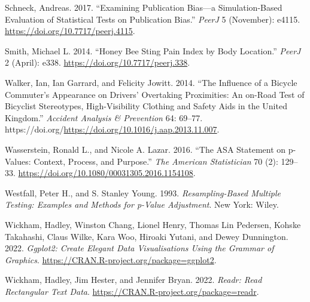 \documentclass[
]{book}
\newlength{\cslhangindent}
\newlength{\cslentryspacingunit} %
\newenvironment{CSLReferences}[2] %
 {%
  \setlength{\parindent}{0pt}
  \ifodd #1
  \let\oldpar\par
  \def\par{\hangindent=\cslhangindent\oldpar}
  \fi
  \setlength{\parskip}{#2\cslentryspacingunit}
 }%
 {}
\begin{document}
\begin{CSLReferences}{1}{0}
\leavevmode{}%
Schneck, Andreas. 2017. {``Examining Publication Bias---a Simulation-Based Evaluation of Statistical Tests on Publication Bias.''} \emph{PeerJ} 5 (November): e4115. \url{https://doi.org/10.7717/peerj.4115}.

\leavevmode{}%
Smith, Michael L. 2014. {``Honey Bee Sting Pain Index by Body Location.''} \emph{PeerJ} 2 (April): e338. \url{https://doi.org/10.7717/peerj.338}.

\leavevmode{}%
Walker, Ian, Ian Garrard, and Felicity Jowitt. 2014. {``The Influence of a Bicycle Commuter's Appearance on Drivers' Overtaking Proximities: An on-Road Test of Bicyclist Stereotypes, High-Visibility Clothing and Safety Aids in the United Kingdom.''} \emph{Accident Analysis \& Prevention} 64: 69--77. https://doi.org/\url{https://doi.org/10.1016/j.aap.2013.11.007}.

\leavevmode{}%
Wasserstein, Ronald L., and Nicole A. Lazar. 2016. {``The ASA Statement on p-Values: Context, Process, and Purpose.''} \emph{The American Statistician} 70 (2): 129--33. \url{https://doi.org/10.1080/00031305.2016.1154108}.

\leavevmode{}%
Westfall, Peter H., and S. Stanley Young. 1993. \emph{Resampling-Based Multiple Testing: Examples and Methods for p-Value Adjustment}. New York: Wiley.

\leavevmode{}%
Wickham, Hadley, Winston Chang, Lionel Henry, Thomas Lin Pedersen, Kohske Takahashi, Claus Wilke, Kara Woo, Hiroaki Yutani, and Dewey Dunnington. 2022. \emph{Ggplot2: Create Elegant Data Visualisations Using the Grammar of Graphics}. \url{https://CRAN.R-project.org/package=ggplot2}.

\leavevmode{}%
Wickham, Hadley, Jim Hester, and Jennifer Bryan. 2022. \emph{Readr: Read Rectangular Text Data}. \url{https://CRAN.R-project.org/package=readr}.

\end{CSLReferences}
\end{document}
